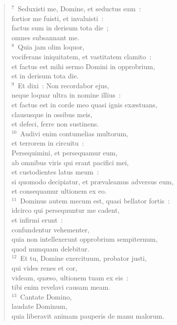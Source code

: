 \begin{verse}${}^{7}$~Seduxisti me, Domine, et seductus sum~:\\ fortior me fuisti, et invaluisti~:\\ factus sum in derisum tota die~;\\ omnes subsannant me.\\
${}^{8}$~Quia jam olim loquor,\\ vociferans iniquitatem, et vastitatem clamito~:\\ et factus est mihi sermo Domini in opprobrium,\\ et in derisum tota die.\\
${}^{9}$~Et dixi~: Non recordabor ejus,\\ neque loquar ultra in nomine illius~:\\ et factus est in corde meo quasi ignis ex\ae stuans,\\ claususque in ossibus meis,\\ et defeci, ferre non sustinens.\\
${}^{10}$~Audivi enim contumelias multorum,\\ et terrorem in circuitu~:\\ Persequimini, et persequamur eum,\\ ab omnibus viris qui erant pacifici mei,\\ et custodientes latus meum~:\\ si quomodo decipiatur, et pr\ae valeamus adversus eum,\\ et consequamur ultionem ex eo.\\
${}^{11}$~Dominus autem mecum est, quasi bellator fortis~:\\ idcirco qui persequuntur me cadent,\\ et infirmi erunt~:\\ confundentur vehementer,\\ quia non intellexerunt opprobrium sempiternum,\\ quod numquam delebitur.\\
${}^{12}$~Et tu, Domine exercituum, probator justi,\\ qui vides renes et cor,\\ videam, qu\ae so, ultionem tuam ex eis~:\\ tibi enim revelavi causam meam.\\
${}^{13}$~Cantate Domino,\\ laudate Dominum,\\ quia liberavit animam pauperis de manu malorum.\\

\end{verse}
